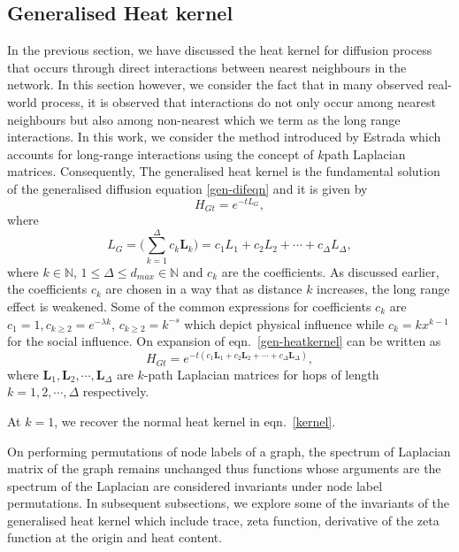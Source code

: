 \documentclass[10pt,a4paper]{article}
\begin{document}
        \subsection{Generalised Heat kernel}
        In the previous section, we have discussed the heat kernel for diffusion process that occurs through direct interactions between nearest neighbours in the network. In this section however, we consider the fact that in many observed real-world process, it is observed that interactions do not only occur among nearest neighbours but also among non-nearest which we term as the long range interactions. In this work, we consider the method introduced by Estrada \citep{estrada2012path} which accounts for long-range interactions using the concept of $k$path Laplacian matrices. Consequently, The generalised heat kernel is the fundamental solution of the generalised diffusion equation \ref{gen-difeqn} and it is given by 
        \begin{equation}
        H_{Gt} = e^{-t L_{G}},
        \end{equation}
        where
        \begin{equation}
        L_{G} =  \Big(\sum_{k=1}^{\Delta}c_k\mathbf{L}_{k} \Big) = c_{1}L_{1} + c_{2}L_{2} + \cdots + c_{\Delta}L_{\Delta}, 
        \label{gen-heatkernel}
        \end{equation}
        where $k\in \mathbb{N}$, $1 \leq \Delta \leq d_{max} \in \mathbb{N}$ and $c_k$ are the coefficients. As discussed earlier, 
        the coefficients $c_k$  are chosen in a way that as distance $k$ increases, the long range effect is weakened. Some of the common expressions for coefficients $c_k$ are $c_1 =1, c_{k\geq 2} = e^{-\lambda k}$, $ c_{k\geq 2} =k^{-s}$ which depict physical influence while $c_k = kx^{k-1}$ for the social influence.
        On expansion of eqn.~\ref{gen-heatkernel} can be written as 
        \begin{equation}
        H_{Gt} = e^{-t(c_{1}\mathbf{L}_{1} + c_{2}\mathbf{L}_{2} + \cdots + c_{\Delta}\mathbf{L}_{\Delta})},
        \label{heatkernel-hsope}
        \end{equation}
        where $\mathbf{L}_1, \mathbf{L}_2, \cdots, \mathbf{L}_{\Delta}$ are  $k$-path Laplacian matrices for hops of length $k=1,2,\cdots, \Delta$ respectively. 
        
        At $k=1$, we recover the normal heat kernel in eqn.~\ref{kernel}.
        
        On performing permutations of node labels of a graph, the spectrum of Laplacian matrix of the graph remains unchanged thus functions whose arguments are the spectrum of the Laplacian are considered invariants under node label permutations. In subsequent subsections, we explore some of the invariants of the generalised heat kernel which include trace, zeta function, derivative of the zeta function at the origin and heat content.
        
\end{document}
